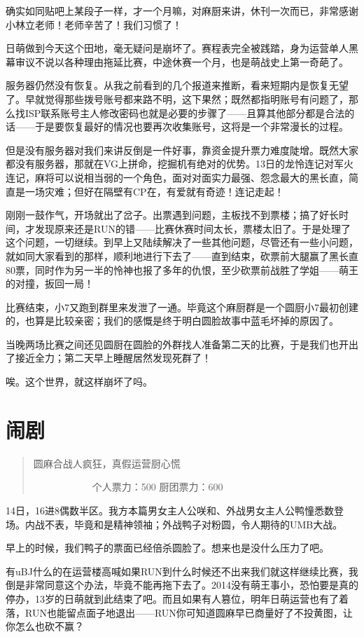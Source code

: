 确实如同贴吧上某段子一样，才一个月嘛，对麻厨来讲，休刊一次而已，非常感谢小林立老师！老师辛苦了！我们习惯了！

日萌做到今天这个田地，毫无疑问是崩坏了。赛程表完全被践踏，身为运营单人黑幕审议不说以各种理由拖延比赛，中途休赛一个月，也是萌战史上第一奇葩了。

服务器仍然没有恢复。从我之前看到的几个报道来推断，看来短期内是恢复无望了。早就觉得那些拨号账号都来路不明，这下果然；既然都指明账号有问题了，那么找ISP联系账号主人修改密码也就是必要的步骤了——且算其他部分都是合法的话——于是要恢复最好的情况也要再次收集账号，这将是一个非常漫长的过程。

但是没有服务器对我们来讲反倒是一件好事，靠资金提升票力难度陡增。既然大家都没有服务器，那就在VG上拼命，挖掘机有绝对的优势。13日的龙怜连记对军火连记，麻将可以说相当弱的一个角色，面对对面实力最强、怨念最大的黑长直，简直是一场灾难；但好在隔壁有CP在，有爱就有奇迹！连记走起！

刚刚一鼓作气，开场就出了岔子。出票遇到问题，主板找不到票楼；搞了好长时间，才发现原来还是RUN的错——比赛休赛时间太长，票楼太旧了。于是处理了这个问题，一切继续。到早上又陆续解决了一些其他问题，尽管还有一些小问题，就如同大家看到的那样，顺利地进行下去了——直到结束，砍票前大腿赢了黑长直80票，同时作为另一半的怜神也报了多年的仇恨，至少砍票前战胜了学姐——萌王的对撞，扳回一局！

比赛结束，小7又跑到群里来发泄了一通。毕竟这个麻厨群是一个圆厨小7最初创建的，也算是比较亲密；我们的感慨是终于明白圆脸故事中蓝毛坏掉的原因了。

当晚两场比赛之间还见圆厨在圆脸的外群找人准备第二天的比赛，于是我们也开出了接近全力；第二天早上睡醒居然发现死群了！

唉。这个世界，就这样崩坏了吗。


\chapter{闹剧}
\begin{quote}
圆麻合战人疯狂，真假运营厨心慌

　　　　　　个人票力：500 厨团票力：600
\end{quote}

14日，16进8偶数半区。我方本篇男女主人公咲和、外战男女主人公鸭憧悉数登场。内战不表，毕竟和是精神领袖；外战鸭子对粉圆，令人期待的UMB大战。

早上的时候，我们鸭子的票面已经倍杀圆脸了。想来也是没什么压力了吧。

有uBJ什么的在运营楼高喊如果RUN到什么时候还不出来我们就这样继续比赛，我倒是非常同意这个办法，毕竟不能再拖下去了。2014没有萌王事小，恐怕要是真的停办，13岁的日萌就到此结束了吧。而且如果有人篡位，明年日萌运营也有了着落，RUN也能留点面子地退出——RUN你可知道圆麻早已商量好了不投黄图，让你怎么也砍不赢？

